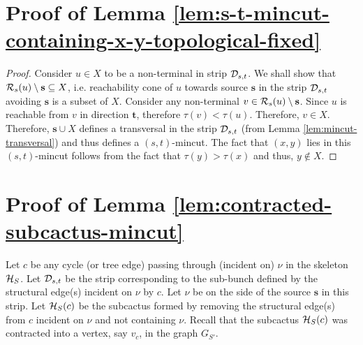 \section{Proof of Lemma \ref{lem:s-t-mincut-containing-x-y-topological-fixed}}\label{appendix:s-t-mincut-containing-x-y-topological-fixed}
\begin{proof}
Consider $u \in X$ to be a non-terminal in strip ${\cal D}_{s,t}$. We shall show that ${\cal R}_s(u) \setminus \mathbf{s} \subseteq X$, i.e. reachability cone of $u$ towards source ${\mathbf s}$ in the strip ${\cal D}_{s,t}$ avoiding $\mathbf s$ is a subset of $X$. Consider any non-terminal $v \in {\cal R}_s(u) \setminus \mathbf{s}$. Since $u$ is reachable from $v$ in direction $\mathbf t$, therefore $\tau(v) < \tau(u)$. Therefore, $v \in X$. Therefore, ${\mathbf s} \cup X$ defines a transversal in the strip ${\cal D}_{s,t}$ (from Lemma \ref{lem:mincut-transversal}) and thus defines a $(s,t)$-mincut. The fact that $(x,y)$ lies in this $(s,t)$-mincut follows from the fact that $\tau(y) > \tau(x)$ and thus, $y \not \in X$.
\end{proof}


\section{Proof of Lemma \ref{lem:contracted-subcactus-mincut}} \label{appendix:contracted-subcactus-mincut}

Let $c$ be any cycle (or tree edge) passing through (incident on) $\nu$ in the skeleton
${\cal H}_S$. Let ${\cal D}_{s,t}$ be the strip corresponding to the sub-bunch defined by the structural edge(s) incident on $\nu$ by $c$.
Let $\nu$ be on the side of the source $\mathbf{s}$ in this strip.
Let ${\cal H}_S(c)$ be the subcactus formed by removing the structural edge(s) from $c$ incident on $\nu$ and not containing $\nu$. 
Recall that the subcactus ${\cal H}_S(c)$ was contracted into a vertex, say $v_c$, in the graph 
$G_{S'}$.

